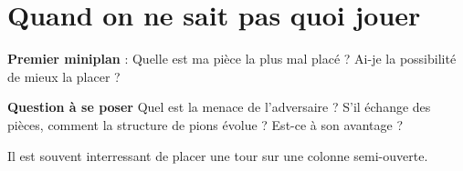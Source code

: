 

\section{Quand on ne sait pas quoi jouer}

{\bf Premier miniplan} : Quelle est ma pièce la plus mal placé ? Ai-je la possibilité de mieux la placer ?

{\bf Question à se poser} Quel est la menace de l'adversaire ? S'il échange des pièces, comment la structure de pions évolue ? Est-ce à son avantage ?


Il est souvent interressant de placer une tour sur une colonne semi-ouverte.
